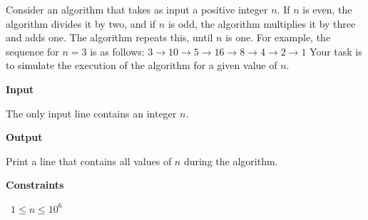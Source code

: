 Consider an algorithm that takes as input a positive integer $n$. If $n$ is even, the algorithm divides it by two, and if $n$ is odd, the algorithm multiplies it by three and adds one. The algorithm repeats this, until $n$ is one. For example, the sequence for $n=3$ is as follows:
$ 3 \rightarrow 10 \rightarrow 5 \rightarrow 16 \rightarrow 8 \rightarrow 4 \rightarrow 2 \rightarrow 1$
Your task is to simulate the execution of the algorithm for a given value of $n$.

\vspace{0.3cm}\noindent\textbf{Input}

The only input line contains an integer $n$.

\vspace{0.3cm}\noindent\textbf{Output}

Print a line that contains all values of $n$ during the algorithm.

\vspace{0.3cm}\noindent\textbf{Constraints}

\textbullet\ $1 \le n \le 10^6$